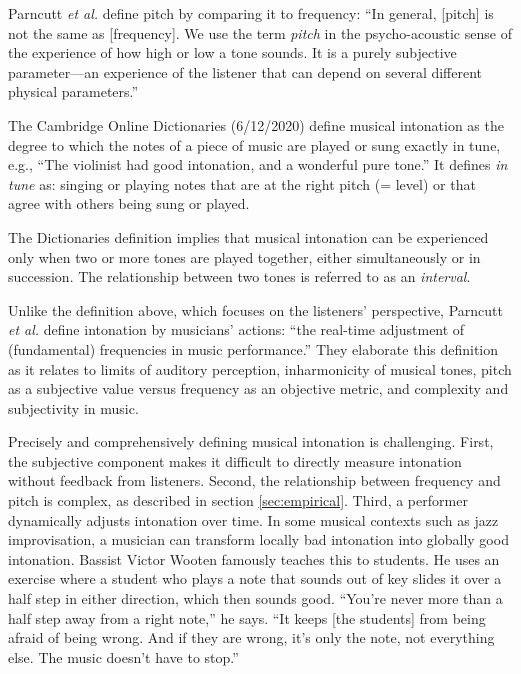 Parncutt \textit{et al.} define pitch by comparing it to frequency: ``In general, [pitch] is not the same as [frequency]. We use the term \textit{pitch} in the psycho-acoustic sense of the experience of how high or low a tone sounds. It is a purely subjective parameter---an experience of the listener that can depend on several different physical parameters.'' \cite[p.~477]{parncutt2018psychocultural}

The Cambridge Online Dictionaries (6/12/2020) define musical intonation as the degree to which the notes of a piece of music are played or sung exactly in  tune,  e.g.,  ``The  violinist  had  good  intonation,  and a wonderful pure tone.'' It defines \textit{in tune} as: singing or playing notes that are at the right pitch (= level) or that agree with others being sung or played. 

The Dictionaries definition implies that musical intonation can be experienced only when two or more tones are played together, either simultaneously or in succession. The relationship between two tones is referred to as an \textit{interval}.

Unlike the definition above, which focuses on the listeners' perspective, Parncutt \textit{et al.} define intonation by musicians' actions: ``the real-time adjustment of (fundamental) frequencies in music performance.'' \cite[p.~477]{parncutt2018psychocultural} They elaborate this definition as it relates to limits of auditory perception, inharmonicity of musical tones, pitch as a subjective value versus frequency as an objective metric, and complexity and subjectivity in music.

Precisely and comprehensively defining musical intonation is challenging. First, the subjective component makes it difficult to directly measure intonation without feedback from listeners. Second, the relationship between frequency and pitch is complex, as described in section \ref{sec:empirical}. Third, a performer dynamically adjusts intonation over time. In some musical contexts such as jazz improvisation, a musician can transform locally bad intonation into globally good intonation. Bassist Victor Wooten famously teaches this to students. He uses an exercise where a student who plays a note that sounds out of key slides it over a half step in either direction, which then sounds good. ``You’re never more than a half step away from a right note,'' he says. ``It keeps [the students] from being afraid of being wrong. And if they are wrong, it’s only the note, not everything else. The music doesn’t have to stop.'' \cite{Freddy2020}

